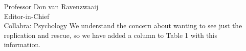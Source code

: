 \documentclass{stanfordletter}
\begin{document}
\begin{letter}{Professor Don van Ravenzwaaij \\ Editor-in-Chief \\ Collabra: Psychology }
	We understand the concern about wanting to see just the replication and rescue, so we have added a column to Table 1 with this information.
	
	
	

\end{letter}
\end{document}
